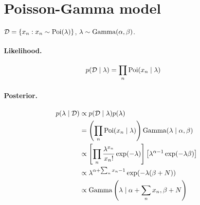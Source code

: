 \section{Poisson-Gamma model}
$\mathcal D = \{x_n : x_n \sim \operatorname{Poi}(\lambda)\}$, $\lambda \sim \operatorname{Gamma}(\alpha, \beta)$.

\paragraph{Likelihood.}
    \begin{align*}
        p(\mathcal D \mid \lambda) &= \prod_n \operatorname{Poi}(x_n \mid \lambda)
    \end{align*}

\paragraph{Posterior.}
    \begin{align*}
        p(\lambda \mid \mathcal D)  &\propto p(\mathcal D \mid \lambda) p(\lambda) \\
                                    &= \left(\prod_n \operatorname{Poi}(x_n \mid \lambda) \right) \operatorname{Gamma}(\lambda \mid \alpha, \beta) \\
                                    &\propto \left[\prod_n \frac{\lambda^{x_n}}{x_n!} \exp(-\lambda)\right] \left[\lambda^{\alpha - 1} \exp(-\lambda\beta)\right] \\
                                    &\propto \lambda^{\alpha + \sum_n x_n - 1} \exp(-\lambda(\beta + N)) \\
                                    &\propto \operatorname{Gamma}\left(\lambda \mid \alpha + \sum_n x_n, \beta + N\right)
    \end{align*}

